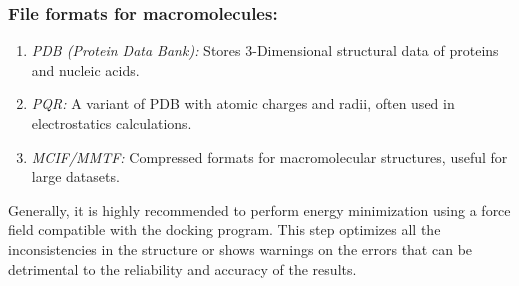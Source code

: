 \subsubsection*{File formats for macromolecules:}
    \begin{enumerate}
        \item \textit{PDB (Protein Data Bank):} Stores 3-Dimensional structural data of proteins and nucleic acids. 
	       \item \textit{PQR:} A variant of PDB with atomic charges and radii, often used in electrostatics calculations.
	       \item \textit{MCIF/MMTF:} Compressed formats for macromolecular structures, useful for large datasets. 
    \end{enumerate}


Generally, it is highly recommended to perform energy minimization using a force field compatible with the docking program. This step optimizes all the inconsistencies in the structure or shows warnings on the errors that can be detrimental to the reliability and accuracy of the results. 


